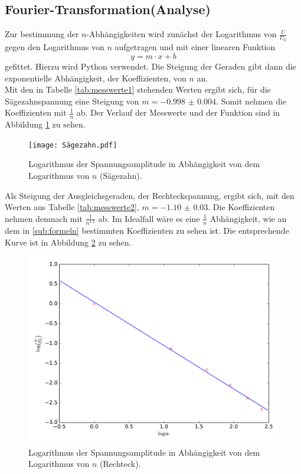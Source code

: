 \documentclass[
  bibliography=totoc,     %
  captions=tableheading,  %
  titlepage=firstiscover, %
]{scrartcl}
\begin{document}
\subsection{Fourier-Transformation(Analyse)}
Zur bestimmung der $n$-Abhängigkeiten wird zunächst der Logarithmus von $\frac{U}{U_0}$
gegen den Logarithmus von $n$ aufgetragen und mit einer linearen Funktion
\begin{equation}
  y = m \cdot x + b
\end{equation}
gefittet. Hierzu wird Python
verwendet. Die Steigung der Geraden gibt dann die exponentielle Abhängigkeit, der Koeffizienten,
von $n$ an.\\
Mit den in Tabelle \ref{tab:messwerte1} stehenden Werten ergibt sich, für die Sägezahnspannung
eine Steigung von $m = \num{-0.998(4)}$. Somit nehmen die Koeffizienten mit $\frac{1}{n}$ ab.
Der Verlauf der Messwerte und der Funktion sind in Abbildung \ref{fig:plot1} zu sehen.
\begin{figure}
  \centering
  \texttt{[image: Sägezahn.pdf]}
  \caption{Logarithmus der Spannungsamplitude in Abhängigkeit von dem Logarithmus von $n$ (Sägezahn).}
  \label{fig:plot1}
\end{figure}
\clearpage
Als Steigung der Ausgleichsgeraden, der Rechteckspannung, ergibt sich, mit den Werten aus
Tabelle \ref{tab:messwerte2}, $m = \num{-1.10(3)}$. Die Koeffizienten nehmen demnach
mit $\frac{1}{n^{1.1}}$ ab. Im Idealfall wäre es eine $\frac{1}{n}$ Abhängigkeit, wie
an dem in \ref{sub:formeln} bestimmten Koeffizienten zu sehen ist.
Die entsprechende Kurve ist in Abbildung \ref{fig:plot2} zu sehen.
\begin{figure}
  \centering
  \includegraphics[width=\textwidth]{Rechteck.pdf}
  \caption{Logarithmus der Spannungsamplitude in Abhängigkeit von dem Logarithmus von $n$ (Rechteck).}
  \label{fig:plot2}
\end{figure}
\end{document}
